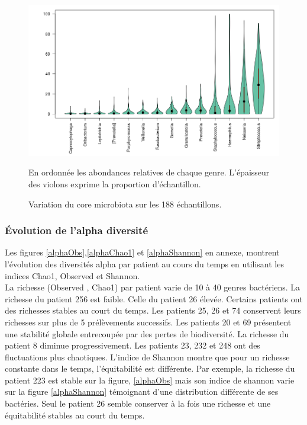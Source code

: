 \documentclass[12pt,a4paper]{article}
\begin{document}
\begin{figure}
\begin{center}
\includegraphics[scale=0.6]{img/variability.png}\hfill
\end{center}
\caption{Variation du core microbiota sur les 188 échantillons.}
En ordonnée les abondances relatives de chaque genre. L’épaisseur des violons exprime la proportion d'échantillon.
\label{violon}
\end{figure}
\clearpage

\subsubsection{Évolution de l'alpha diversité}
Les figures \ref{alphaObs},\ref{alphaChao1} et \ref{alphaShannon} en annexe, montrent l’évolution des diversités alpha par patient au cours du temps en utilisant les indices Chao1, Observed et Shannon. \\
La richesse (Observed , Chao1) par patient varie de 10 à 40 genres bactériens. La richesse du patient 256 est faible. Celle du patient 26 élevée.
Certains patients ont des richesses stables au court du temps. Les patients 25, 26 et 74 conservent leurs richesses sur plus de 5 prélèvements successifs. Les patients 20 et 69 présentent une stabilité globale entrecoupée par des pertes de biodiversité. La richesse du patient 8 diminue progressivement. Les patients 23, 232 et 248 ont des fluctuations plus chaotiques.
L'indice de Shannon montre que pour un richesse constante dans le temps, l'équitabilité est différente. Par exemple, la richesse du patient 223 est stable sur la figure, \ref{alphaObs} mais son indice de shannon varie sur la figure \ref{alphaShannon} témoignant d'une distribution différente de ses bactéries. Seul le patient 26 semble conserver à la fois une richesse et une équitabilité stables au court du temps.
\end{document}
